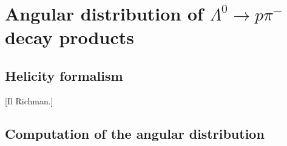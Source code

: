 \chapter{Angular distribution of \texorpdfstring{$\Lambda^0 \rightarrow p\pi^-$}{Lambda to proton-pion} decay products}
\label{chap:angular-distribution}

\section{Helicity formalism}
[Il Richman.]

\section{Computation of the angular distribution}